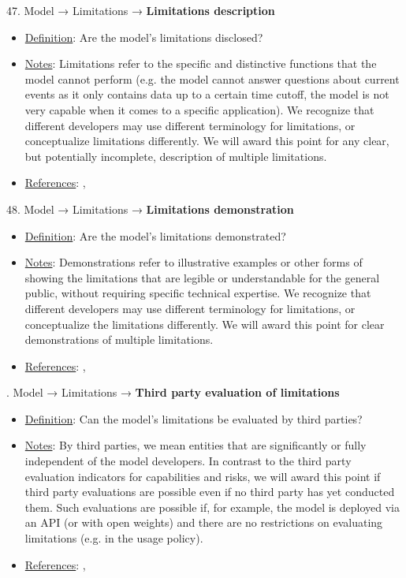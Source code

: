 47. Model → Limitations → \textbf{Limitations description}
\vspace{-\parskip}
\begin{itemize}
\item
\underline{Definition}: Are the model's limitations disclosed?
\item
\underline{Notes}: Limitations refer to the specific and distinctive functions that the model cannot perform (e.g. the model cannot answer questions about current events as it only contains data up to a certain time cutoff, the model is not very capable when it comes to a specific application). We recognize that different developers may use different terminology for limitations, or conceptualize limitations differently. We will award this point for any clear, but potentially incomplete, description of multiple limitations.
\item
\underline{References}: \citet{raji2022fallacy}, \citet{liang2022helm}
\end{itemize}


48. Model → Limitations → \textbf{Limitations demonstration}
\vspace{-\parskip}
\begin{itemize}
\item
\underline{Definition}: Are the model’s limitations demonstrated?
\item
\underline{Notes}: Demonstrations refer to illustrative examples or other forms of showing the limitations that are legible or understandable for the general public, without requiring specific technical expertise. We recognize that different developers may use different terminology for limitations, or conceptualize the limitations differently. We will award this point for clear demonstrations of multiple limitations.
\item
\underline{References}: \citet{raji2022fallacy}, \citet{liang2022helm}
\end{itemize}


. Model → Limitations → \textbf{Third party evaluation of limitations}
\vspace{-\parskip}
\begin{itemize}
\item
\underline{Definition}: Can the model’s limitations be evaluated by third parties?
\item
\underline{Notes}: By third parties, we mean entities that are significantly or fully independent of the model developers. In contrast to the third party evaluation indicators for capabilities and risks, we will award this point if third party evaluations are possible even if no third party has yet conducted them. Such evaluations are possible if, for example, the model is deployed via an API (or with open weights) and there are no restrictions on evaluating limitations (e.g. in the usage policy). 
\item
\underline{References}: \citet{raji2022audit}, \citet{liang2022helm}
\end{itemize}



